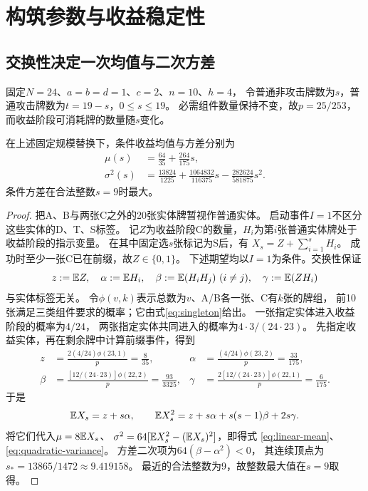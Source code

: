 \FloatBarrier
\section{构筑参数与收益稳定性}\label{sec:construction}
\subsection{交换性决定一次均值与二次方差}
固定$N=24$、$a=b=d=1$、$c=2$、$n=10$、$h=4$，
令普通非攻击牌数为$s$，普通攻击牌数为$t=19-s$，$0\le s\le19$。
必需组件数量保持不变，故$p=25/253$，而收益阶段可消耗牌的数量随$s$变化。

\begin{proposition}\label{prop:polynomial}
在上述固定规模替换下，条件收益均值与方差分别为
\begin{align}
\mu(s)&=\frac{64}{35}+\frac{264}{175}s,\label{eq:linear-mean}\\
\sigma^2(s)&=\frac{13824}{1225}
+\frac{1064832}{116375}s-\frac{282624}{581875}s^2.\label{eq:quadratic-variance}
\end{align}
条件方差在合法整数$s=9$时最大。
\end{proposition}

\begin{proof}
把A、B与两张C之外的20张实体牌暂视作普通实体。
启动事件$I=1$不区分这些实体的D、T、S标签。
记$Z$为收益阶段C的数量，$H_i$为第$i$张普通实体牌处于收益阶段的指示变量。
在其中固定选$s$张标记为S后，有
$X_s=Z+\sum_{i=1}^sH_i$。
成功时至少一张C已在前缀，故$Z\in\{0,1\}$。
下述期望均以$I=1$为条件。交换性保证
\[
z:=\mathbb E Z,\quad \alpha:=\mathbb E H_i,\quad
\beta:=\mathbb E(H_iH_j)\ (i\ne j),\quad
\gamma:=\mathbb E(ZH_i)
\]
与实体标签无关。
令$\phi(v,k)$表示总数为$v$、A/B各一张、C有$k$张的牌组，
前10张满足三类组件要求的概率；它由式\eqref{eq:singleton}给出。
一张指定实体进入收益阶段的概率为$4/24$，
两张指定实体共同进入的概率为$4\cdot3/(24\cdot23)$。
先指定收益实体，再在剩余牌中计算前缀事件，得到
\begin{equation}\label{eq:tagged-moments}
\begin{aligned}
z&=\frac{2(4/24)\phi(23,1)}p=\frac8{35},&
\alpha&=\frac{(4/24)\phi(23,2)}p=\frac{33}{175},\\
\beta&=\frac{[12/(24\cdot23)]\phi(22,2)}p=\frac{93}{3325},&
\gamma&=\frac{2[12/(24\cdot23)]\phi(22,1)}p=\frac6{175}.
\end{aligned}
\end{equation}
于是
\begin{equation}\label{eq:indicator-second}
\mathbb E X_s=z+s\alpha,\qquad
\mathbb E X_s^2=z+s\alpha+s(s-1)\beta+2s\gamma.
\end{equation}
将它们代入$\mu=8\mathbb E X_s$、
$\sigma^2=64[\mathbb E X_s^2-(\mathbb E X_s)^2]$，即得式
\eqref{eq:linear-mean}、\eqref{eq:quadratic-variance}。
方差二次项为$64(\beta-\alpha^2)<0$，
其连续顶点为$s_*=13865/1472\approx9.419158$。
最近的合法整数为9，故整数最大值在$s=9$取得。
\end{proof}

